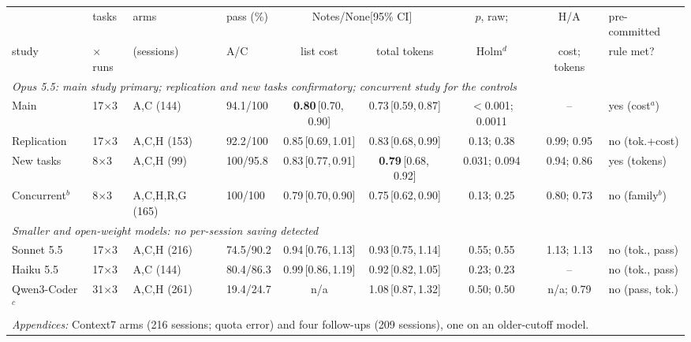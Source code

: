 \documentclass[11pt]{article}
\newcommand{\tci}[2]{\,{\scriptsize[#1,\,#2]}}
\newcommand{\aNone}{\textsf{None}\xspace}
\newcommand{\aNotes}{\textsf{Notes}\xspace}
\begin{document}
\begin{table}[t]
\centering
\footnotesize
\setlength{\tabcolsep}{1.7pt}
\begin{tabular}{llllccccl}
\toprule
 & tasks & arms & pass (\%) & \multicolumn{2}{c}{\aNotes/\aNone [95\% CI]} & $p$, raw; & H/A & pre-committed \\
\cmidrule(lr){5-6}
study & $\times$runs & (sessions) & A/C & list cost & total tokens & Holm$^{d}$ & cost; tokens & rule met? \\
\midrule
\multicolumn{9}{l}{\emph{Opus 5.5: main study primary; replication and new tasks confirmatory; concurrent study for the controls}} \\
Main & 17$\times$3 & A,C (144) & 94.1/100 & \textbf{0.80}\tci{0.70}{0.90} & 0.73\tci{0.59}{0.87} & $<$0.001; 0.0011 & -- & yes (cost$^{a}$) \\
Replication & 17$\times$3 & A,C,H (153) & 92.2/100 & 0.85\tci{0.69}{1.01} & 0.83\tci{0.68}{0.99} & 0.13; 0.38 & 0.99; 0.95 & no (tok.+cost) \\
New tasks & 8$\times$3 & A,C,H (99) & 100/95.8 & 0.83\tci{0.77}{0.91} & \textbf{0.79}\tci{0.68}{0.92} & 0.031; 0.094 & 0.94; 0.86 & yes (tokens) \\
Concurrent$^{b}$ & 8$\times$3 & A,C,H,R,G (165) & 100/100 & 0.79\tci{0.70}{0.90} & 0.75\tci{0.62}{0.90} & 0.13; 0.25 & 0.80; 0.73 & no (family$^{b}$) \\
\midrule
\multicolumn{9}{l}{\emph{Smaller and open-weight models: no per-session saving detected}} \\
Sonnet 5.5 & 17$\times$3 & A,C,H (216) & 74.5/90.2 & 0.94\tci{0.76}{1.13} & 0.93\tci{0.75}{1.14} & 0.55; 0.55 & 1.13; 1.13 & no (tok., pass) \\
Haiku 5.5 & 17$\times$3 & A,C (144) & 80.4/86.3 & 0.99\tci{0.86}{1.19} & 0.92\tci{0.82}{1.05} & 0.23; 0.23 & -- & no (tok., pass) \\
Qwen3-Coder$^{c}$ & 31$\times$3 & A,C,H (261) & 19.4/24.7 & n/a & 1.08\tci{0.87}{1.32} & 0.50; 0.50 & n/a; 0.79 & no (pass, tok.) \\
\midrule
\multicolumn{9}{l}{\emph{Appendices:} Context7 arms (216 sessions; quota error) and four follow-ups (209 sessions), one on an older-cutoff model.} \\
\bottomrule
\end{tabular}

\end{table}
\end{document}
